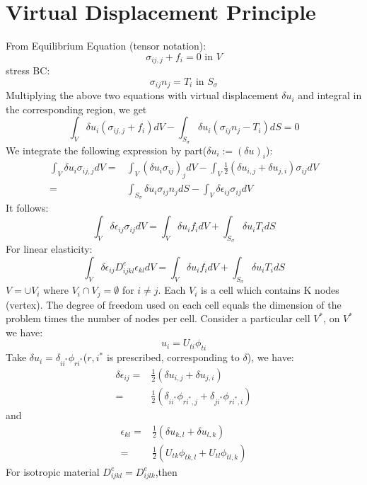 \documentclass{article}
\begin{document}
\section{Virtual Displacement Principle}
From Equilibrium Equation (tensor notation):
\[
\sigma_{ij,j}+f_i=0 \text{ in } V
\]
stress BC:
\[
\sigma_{ij}n_j=T_i \text{ in } S_{\sigma}
\]
Multiplying the above two equations with virtual displacement
$\delta{u}_i$ and integral in the corresponding region, we get
\begin{equation}
\int_V \delta{u_i}(\sigma_{ij,j}+f_i)dV-\int_{S_{\sigma}} \delta{u_i}(\sigma_{ij}n_j-T_i)dS=0
\end{equation}
We integrate the following expression by part($\delta u_i:=(\delta u)_i$):
\begin{align*}
\int_V \delta{u_i}\sigma_{ij,j}dV=& \int_V (\delta u_i \sigma_{ij} )_j dV-\int_V \frac{1}{2}(\delta u_{i,j}+\delta u_{j,i})\sigma_{ij} dV\\
=&\int_{S_{\sigma}} \delta u_i \sigma_{ij} n_j dS-\int_V \delta \epsilon_{ij} \sigma_{ij} dV
\end{align*}
It follows:
\begin{equation}
\int_V \delta{\epsilon_{ij}}\sigma_{ij}dV=\int_V \delta u_i f_i dV+\int_{S_{\sigma}} \delta{u_i}T_idS
\end{equation}
For linear elasticity:
\begin{equation}\label{eq:LE}
\int_V \delta{\epsilon_{ij}}D_{ijkl}^e \epsilon_{kl}dV=\int_V \delta u_i f_i dV+\int_{S_{\sigma}} \delta{u_i}T_idS
\end{equation}
$V=\cup V_i$ where $V_i \cap V_j =\emptyset$ for $i\neq j$.
Each $V_i$ is a cell which contains K nodes (vertex). The degree of freedom used on each cell equals the dimension of the problem times the number of nodes per cell.
Consider a particular cell $V^*$, on $V^*$ we have:
\[
u_i=U_{ti}\phi_{ti}
\]
Take $\delta u_i=\delta_{ii^*}\phi_{ri^*}$($r,i^*$ is prescribed, corresponding to $\delta$), we have:
\begin{align*}
\delta{\epsilon_{ij}}=&\frac{1}{2}(\delta u_{i,j}+\delta u_{j,i})\\
=&\frac{1}{2}(\delta_{ii^*}\phi_{ri^*,j}+\delta_{ji^*}\phi_{ri^*,i})
\end{align*}
and
\begin{align*}
{\epsilon_{kl}}=&\frac{1}{2}(\delta u_{k,l}+\delta u_{l,k})\\
=&\frac{1}{2}(U_{tk}\phi_{tk,l}+U_{tl}\phi_{tl,k})
\end{align*}
For isotropic material $D_{ijkl}^e=D_{ijlk}^e$,then
\end{document}
